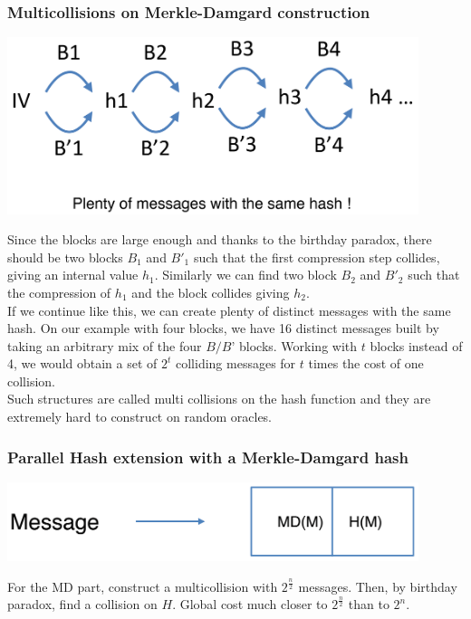 		\subsubsection{Multicollisions on Merkle-Damgard construction}
			\begin{center}
				\includegraphics[width=120mm]{Graphics/Hash Functions/hf20.png}
			\end{center}
			Since the blocks are large enough and thanks to the birthday paradox, there should be two blocks $B_1$ and $B'_1$ such that the first compression step collides, giving an internal value $h_1$.
			Similarly we can find two block $B_2$ and $B'_2$ such that the compression of $h_1$ and the block collides giving $h_2$.\\
			If we continue like this, we can create plenty of distinct messages with the same hash. 
			On our example with four blocks, we have 16 distinct messages built by taking an arbitrary mix of the four $B/B’$ blocks. 
			Working with $t$ blocks instead of 4, we would obtain a set of $2^t$ colliding messages for $t$ times the cost of one collision.\\
			Such structures are called multi collisions on the hash function and they are extremely hard to construct on random oracles.
		
		\subsubsection{Parallel Hash extension with a Merkle-Damgard hash}
			\begin{center}
				\includegraphics[width=120mm]{Graphics/Hash Functions/hf21.png}
			\end{center}
			For the MD part, construct a multicollision with $2^{\frac{n}{2}}$ messages.
			Then, by birthday paradox, find a collision on $H$.
			Global cost much closer to $2^{\frac{n}{2}}$ than to $2^{n}$.\\
			
